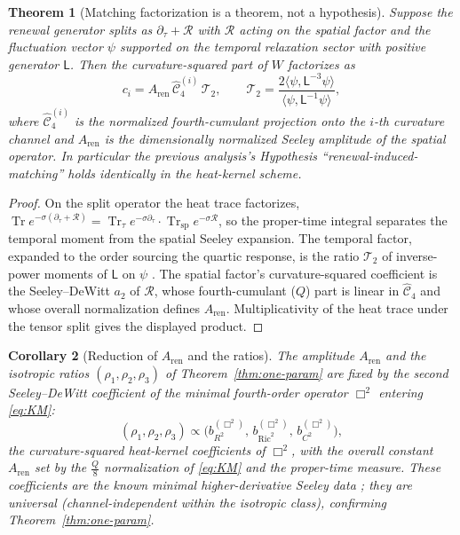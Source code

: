 \documentclass[11pt]{article}
\newtheorem{theorem}{Theorem}[section]
\newtheorem{corollary}[theorem]{Corollary}
\theoremstyle{definition}
\theoremstyle{remark}
\newcommand{\Tr}{\operatorname{Tr}}
\newcommand{\Ric}{\operatorname{Ric}}
\newcommand{\ren}{\mathrm{ren}}
\newcommand{\Aren}{A_{\ren}}
\newcommand{\Weyl}{C}
\begin{document}
\begin{theorem}[Matching factorization is a theorem, not a hypothesis]
\label{thm:induced-factorization}
Suppose the renewal generator splits as
$\partial_\tau+\mathcal R$ with $\mathcal R$ acting on the spatial factor and the
fluctuation vector $\psi$ supported on the temporal relaxation sector with
positive generator $\mathsf L$.  Then the curvature-squared part of $W$
factorizes as
\[
 c_i=\Aren\,\widehat{\mathcal C}^{(i)}_4\,\mathcal T_2,
 \qquad
 \mathcal T_2=\frac{2\langle\psi,\mathsf L^{-3}\psi\rangle}
 {\langle\psi,\mathsf L^{-1}\psi\rangle},
\]
where $\widehat{\mathcal C}^{(i)}_4$ is the normalized fourth-cumulant projection
onto the $i$-th curvature channel and $\Aren$ is the dimensionally normalized
Seeley amplitude of the spatial operator.  In particular the previous analysis's
Hypothesis ``renewal-induced-matching'' holds identically in the heat-kernel
scheme.
\end{theorem}

\begin{proof}
On the split operator the heat trace factorizes,
$\Tr e^{-\sigma(\partial_\tau+\mathcal R)}
=\Tr_\tau e^{-\sigma\partial_\tau}\cdot\Tr_{\mathrm{sp}}e^{-\sigma\mathcal R}$, so
the proper-time integral separates the temporal moment from the spatial
Seeley expansion.  The temporal factor, expanded to the order sourcing the
quartic response, is the ratio $\mathcal T_2$ of inverse-power moments of
$\mathsf L$ on $\psi$ \cite{BarvinskyVilkovisky}.  The spatial factor's
curvature-squared coefficient is the Seeley--DeWitt $a_2$ of $\mathcal R$, whose
fourth-cumulant ($Q$) part is linear in $\widehat{\mathcal C}_4$ and whose
overall normalization defines $\Aren$.  Multiplicativity of the heat trace under
the tensor split gives the displayed product.
\end{proof}

\begin{corollary}[Reduction of $\Aren$ and the ratios]
\label{cor:reduction}
The amplitude $\Aren$ and the isotropic ratios $(\rho_1,\rho_2,\rho_3)$ of
Theorem~\ref{thm:one-param} are fixed by the second Seeley--DeWitt coefficient of
the minimal fourth-order operator $\Box^2$ entering \eqref{eq:KM}:
\[
 (\rho_1,\rho_2,\rho_3)\propto
 \bigl(b_{R^2}^{(\Box^2)},\,b_{\Ric^2}^{(\Box^2)},\,b_{\Weyl^2}^{(\Box^2)}\bigr),
\]
the curvature-squared heat-kernel coefficients of $\Box^2$, with the overall
constant $\Aren$ set by the $\tfrac Q8$ normalization of \eqref{eq:KM} and the
proper-time measure.  These coefficients are the known minimal higher-derivative
Seeley data \cite{Gusynin,BarvinskyVilkovisky,Vassilevich}; they are universal
(channel-independent within the isotropic class), confirming
Theorem~\ref{thm:one-param}.
\end{corollary}
\end{document}
